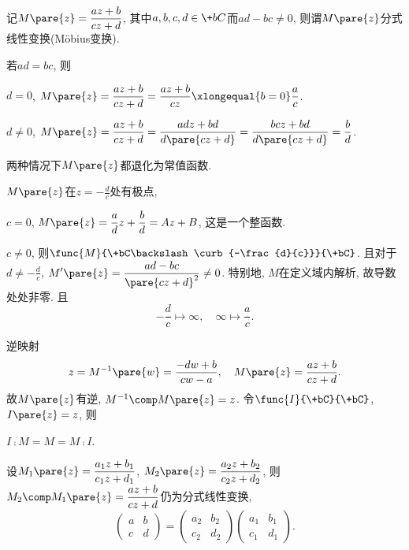 \documentclass{ctexart}
\begin{document}
\begin{definition}
    记$\displaystyle M\pare{z} = \frac{az+b}{cz+d}$, 其中$a,b,c,d\in\+bC$而$ad-bc\neq 0$, 则谓$M\pare{z}$分式线性变换(M\"obius变换).
\end{definition}
\begin{remark}
    若$ad=bc$, 则
    \begin{cenum}
        \item $d=0$, $\displaystyle M\pare{z} = \frac{az+b}{cz+d} = \frac{az+b}{cz} \xlongequal{b=0} \frac{a}{c}$.
        \item $d\neq 0$, $\displaystyle M\pare{z} = \frac{az+b}{cz+d} = \frac{adz+bd}{d\pare{cz+d}} = \frac{bcz+bd}{d\pare{cz+d}} = \frac{b}{d}$.
    \end{cenum}
    两种情况下$M\pare{z}$都退化为常值函数.
\end{remark}
$M\pare{z}$在$\displaystyle z = -\frac{d}{c}$处有极点,
\begin{cenum}
    \item $c=0$, $\displaystyle M\pare{z} = \frac{a}{d}z + \frac{b}{d} = Az+B$, 这是一个整函数.
    \item $c\neq 0$, 则$\displaystyle \func{M}{\+bC\backslash \curb{-\frac{d}{c}}}{\+bC}$. 且对于$\displaystyle d\neq -\frac{d}{c}$, $\displaystyle M'\pare{z} = \frac{ad-bc}{\pare{cz+d}^2} \neq 0$. 特别地, $M$在定义域内解析, 故导数处处非零. 且
    \[ -\frac{d}{c}\mapsto \infty,\quad \infty \mapsto \frac{a}{c}. \]
\end{cenum}
逆映射
\[ z = M^{-1}\pare{w} = \frac{-dw + b}{cw - a},\quad M\pare{z} = \frac{az+b}{cz+d}. \]
故$M\pare{z}$有逆, $M^{-1}\comp M\pare{z} = z$. 令$\func{I}{\+bC}{\+bC}$, $I\pare{z} = z$, 则
\begin{cenum}
    \item $I\comp M = M = M \comp I$.
    \item 设$\displaystyle M_1\pare{z} = \frac{a_1 z + b_1}{c_1 z + d_1}$, $\displaystyle M_2\pare{z} = \frac{a_2 z + b_2}{c_2 z + d_2}$, 则$\displaystyle M_2\comp M_1\pare{z} = \frac{az+b}{cz+d}$仍为分式线性变换,
    \[ \begin{pmatrix}
        a & b \\
        c & d
    \end{pmatrix} = \begin{pmatrix}
        a_2 & b_2 \\
        c_2 & d_2
    \end{pmatrix} \begin{pmatrix}
        a_1 & b_1 \\
        c_1 & d_1
    \end{pmatrix}. \]
\end{cenum}
\end{document}
